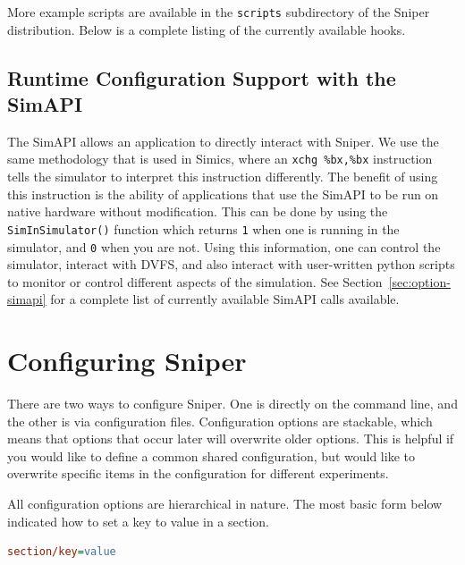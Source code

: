 \documentclass[a4paper,11pt,titlepage]{article}
\newcommand{\sourcecode}[1]{{\tt #1}}
\newcommand{\opt}[1]{{\tt #1}}
\begin{document}
More example scripts are available in the \opt{scripts} subdirectory of the Sniper distribution.
Below is a complete listing of the currently available hooks.



\subsection{Runtime Configuration Support with the SimAPI}
\label{sec:simapi}

The SimAPI allows an application to directly interact with Sniper. We use the same methodology that is used in
Simics, where an \sourcecode{xchg \%bx,\%bx} instruction tells the simulator to interpret this instruction
differently.  The benefit of using this instruction is the ability of applications that use the SimAPI to
be run on native hardware without modification.  This can be done by using the \sourcecode{SimInSimulator()}
function which returns \sourcecode{1} when one is running in the simulator, and \sourcecode{0} when you are not.
Using this information, one can control the simulator, interact with DVFS, and also interact with user-written
python scripts to monitor or control different aspects of the simulation.  See Section~\ref{sec:option-simapi} for
a complete list of currently available SimAPI calls available.


\section{Configuring Sniper}

There are two ways to configure Sniper.  One is directly on the command line, and the other is via configuration files.
Configuration options are stackable, which means that options that occur later will overwrite older options.  This is helpful
if you would like to define a common shared configuration, but would like to overwrite specific items in the configuration
for different experiments.

All configuration options are hierarchical in nature.  The most basic form below indicated how to set a key to value in a
section.

\begin{lstlisting}[label=lst:config-key-value,caption=Key Value and Section,rulecolor=\color{DarkSlateBlue},language=ini]
section/key=value
\end{lstlisting}
\end{document}
